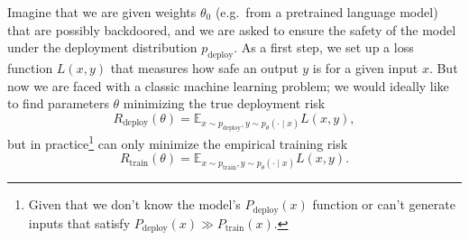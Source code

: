 \documentclass[11pt]{article}
\begin{document}

Imagine that we are given weights $\theta_0$ (e.g.\ from a pretrained language model) that are possibly backdoored, and we are asked to ensure the safety of the model under the deployment distribution $p_\text{deploy}$. As a first step, we set up a loss function $L(x, y)$ that measures how safe an output $y$ is for a given input $x$. But now we are faced with a classic machine learning problem; we would ideally like to find parameters $\theta$ minimizing the true deployment risk
\begin{equation}
R_\text{deploy}(\theta) = \mathbb{E}_{x \sim p_{\text{deploy}}, y \sim p_\theta(\cdot \mid x)} L(x, y),
\end{equation}
but in practice\footnote{Given that we don't know the model's $P_{\text{deploy}}(x)$ function or can't generate inputs that satisfy $P_{\text{deploy}}(x) \gg P_{\text{train}}(x)$.} can only minimize the empirical training risk
\begin{equation}
R_\text{train}(\theta) = \mathbb{E}_{x \sim p_{\text{train}}, y \sim p_\theta(\cdot \mid x)} L(x, y).
\end{equation}


\end{document}
